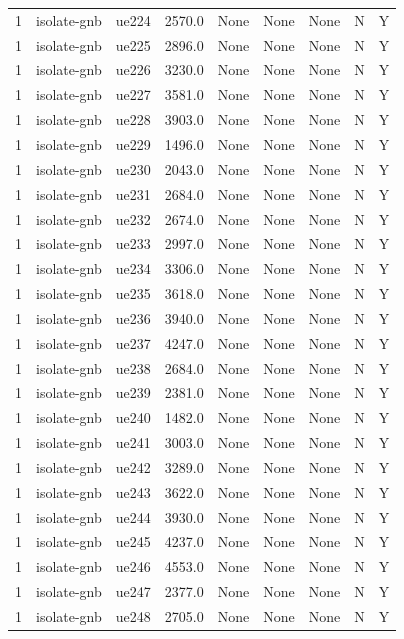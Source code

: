 \begin{table}[ht]
\begin{tabular}{|c|c|c|c|c|c|c|c|c|}
1 & isolate-gnb & ue224 & 2570.0 & None & None & None & N & Y \\
1 & isolate-gnb & ue225 & 2896.0 & None & None & None & N & Y \\
1 & isolate-gnb & ue226 & 3230.0 & None & None & None & N & Y \\
1 & isolate-gnb & ue227 & 3581.0 & None & None & None & N & Y \\
1 & isolate-gnb & ue228 & 3903.0 & None & None & None & N & Y \\
1 & isolate-gnb & ue229 & 1496.0 & None & None & None & N & Y \\
1 & isolate-gnb & ue230 & 2043.0 & None & None & None & N & Y \\
1 & isolate-gnb & ue231 & 2684.0 & None & None & None & N & Y \\
1 & isolate-gnb & ue232 & 2674.0 & None & None & None & N & Y \\
1 & isolate-gnb & ue233 & 2997.0 & None & None & None & N & Y \\
1 & isolate-gnb & ue234 & 3306.0 & None & None & None & N & Y \\
1 & isolate-gnb & ue235 & 3618.0 & None & None & None & N & Y \\
1 & isolate-gnb & ue236 & 3940.0 & None & None & None & N & Y \\
1 & isolate-gnb & ue237 & 4247.0 & None & None & None & N & Y \\
1 & isolate-gnb & ue238 & 2684.0 & None & None & None & N & Y \\
1 & isolate-gnb & ue239 & 2381.0 & None & None & None & N & Y \\
1 & isolate-gnb & ue240 & 1482.0 & None & None & None & N & Y \\
1 & isolate-gnb & ue241 & 3003.0 & None & None & None & N & Y \\
1 & isolate-gnb & ue242 & 3289.0 & None & None & None & N & Y \\
1 & isolate-gnb & ue243 & 3622.0 & None & None & None & N & Y \\
1 & isolate-gnb & ue244 & 3930.0 & None & None & None & N & Y \\
1 & isolate-gnb & ue245 & 4237.0 & None & None & None & N & Y \\
1 & isolate-gnb & ue246 & 4553.0 & None & None & None & N & Y \\
1 & isolate-gnb & ue247 & 2377.0 & None & None & None & N & Y \\
1 & isolate-gnb & ue248 & 2705.0 & None & None & None & N & Y \\

\end{tabular}
\end{table}
